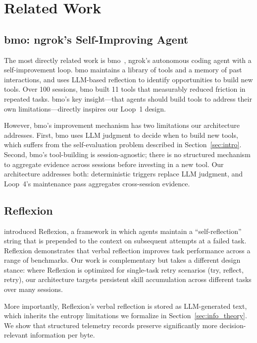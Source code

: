 \documentclass[11pt]{article}
\begin{document}
\section{Related Work}
\label{sec:related}

\subsection{bmo: ngrok's Self-Improving Agent}

The most directly related work is bmo~\cite{bmo2024}, ngrok's autonomous coding
agent with a self-improvement loop. bmo maintains a library of tools and a
memory of past interactions, and uses LLM-based reflection to identify
opportunities to build new tools. Over 100 sessions, bmo built 11 tools that
measurably reduced friction in repeated tasks. bmo's key insight---that agents
should build tools to address their own limitations---directly inspires our
Loop~1 design.

However, bmo's improvement mechanism has two limitations our architecture
addresses. First, bmo uses LLM judgment to decide when to build new tools,
which suffers from the self-evaluation problem described in Section~\ref{sec:intro}.
Second, bmo's tool-building is session-agnostic; there is no structured
mechanism to aggregate evidence across sessions before investing in a new tool.
Our architecture addresses both: deterministic triggers replace LLM judgment,
and Loop~4's maintenance pass aggregates cross-session evidence.

\subsection{Reflexion}

\cite{shinn2023reflexion} introduced Reflexion, a framework in which agents
maintain a ``self-reflection'' string that is prepended to the context on
subsequent attempts at a failed task. Reflexion demonstrates that verbal
reflection improves task performance across a range of benchmarks. Our work
is complementary but takes a different design stance: where Reflexion is
optimized for single-task retry scenarios (try, reflect, retry), our
architecture targets persistent skill accumulation across different tasks over
many sessions.

More importantly, Reflexion's verbal reflection is stored as LLM-generated text,
which inherits the entropy limitations we formalize in
Section~\ref{sec:info_theory}. We show that structured telemetry records
preserve significantly more decision-relevant information per byte.
\end{document}

